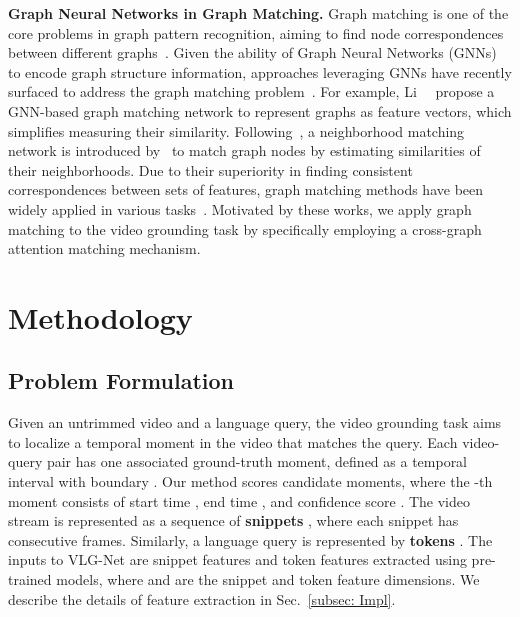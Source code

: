 \documentclass[10pt,twocolumn,letterpaper]{article}
\begin{document}
\noindent \textbf{Graph Neural Networks in Graph Matching.} 
Graph matching is one of the core problems in graph pattern recognition, aiming to find node correspondences between different graphs~\cite{caetano2009learning}. Given the ability of Graph Neural Networks (GNNs) to encode graph structure information, approaches leveraging GNNs have recently surfaced to address the graph matching problem~\cite{wang2019learning, xu2019cross}. For example, Li~\etal~\cite{li2019graph} propose a GNN-based graph matching network to represent graphs as feature vectors, which simplifies measuring their similarity. Following~\cite{li2019graph}, a neighborhood matching network is introduced by~\cite{wu2020neighborhood} to match graph nodes by estimating similarities of their neighborhoods. Due to their superiority in finding consistent correspondences between sets of features, graph matching methods have been widely applied in various tasks~\cite{jing2020visual, liu2020learning, wang2020cross, wu2020neighborhood, xu2019cross}.
Motivated by these works, we apply graph matching to the video grounding task by specifically employing a cross-graph attention matching mechanism.  
 

\section{Methodology}\label{sec: method}
\subsection{Problem Formulation}
Given an untrimmed video and a language query, the video grounding task aims to localize a temporal moment in the video that matches the query. Each video-query pair has one associated ground-truth moment, defined as a temporal interval with boundary . Our method scores  candidate moments, where the -th moment consists of start time , end time , and confidence score . 
The video stream is represented as a sequence of  \textbf{snippets} , where each snippet has  consecutive frames. Similarly, a language query is represented by  \textbf{tokens} . 
The inputs to VLG-Net are  snippet features  and  token features  extracted using pre-trained models, where  and  are the snippet and token feature dimensions. We describe the details of feature extraction in Sec.~\ref{subsec: Impl}.
\end{document}
